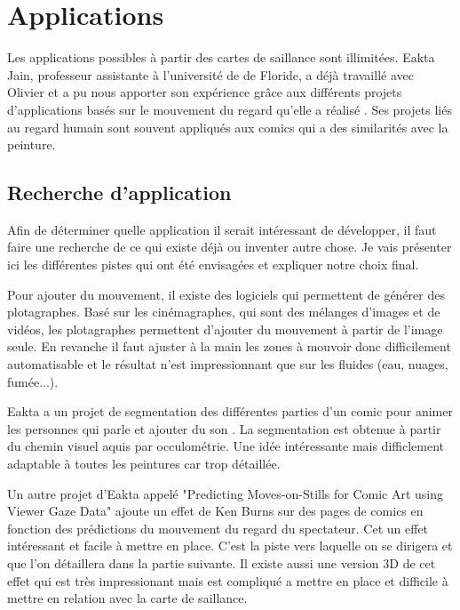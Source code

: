 \chapter{Applications}

\par
Les applications possibles à partir des cartes de saillance sont illimitées. Eakta Jain, professeur assistante à l'université de de Floride, a déjà travaillé avec Olivier et a pu nous apporter son expérience grâce aux différents projets d'applications basés sur le mouvement du regard qu'elle a réalisé \cite{eaktalab}. Ses projets liés au regard humain sont souvent appliqués aux comics qui a des similarités avec la peinture.

\section{Recherche d'application}

\par
Afin de déterminer quelle application il serait intéressant de développer, il faut faire une recherche de ce qui existe déjà ou inventer autre chose. Je vais présenter ici les différentes pistes qui ont été envisagées et expliquer notre choix final.

\par
Pour ajouter du mouvement, il existe des logiciels qui permettent de générer des plotagraphes. Basé sur les cinémagraphes, qui sont des mélanges d'images et de vidéos, les plotagraphes permettent d'ajouter du mouvement à partir de l'image seule. En revanche il faut ajuster à la main les zones à mouvoir donc difficilement automatisable et le résultat n'est impressionnant que sur les fluides (eau, nuages, fumée...).

\par
Eakta a un projet de segmentation des différentes parties d'un comic pour animer les personnes qui parle et ajouter du son \cite{segmentationcomics}. La segmentation est obtenue à partir du chemin visuel aquis par occulométrie. Une idée intéressante mais difficlement adaptable à toutes les peintures car trop détaillée.

\par
Un autre projet d'Eakta appelé "Predicting Moves-on-Stills for Comic Art using Viewer Gaze Data" \cite{kenburns} ajoute un effet de Ken Burns sur des pages de comics en fonction des prédictions du mouvement du regard du spectateur. Cet un effet intéressant et facile à mettre en place. C'est la piste vers laquelle on se dirigera et que l'on détaillera dans la partie suivante. Il existe aussi une version 3D de cet effet \cite{kenburns3D} qui est très impressionant mais est compliqué a mettre en place et difficile à mettre en relation avec la carte de saillance.

